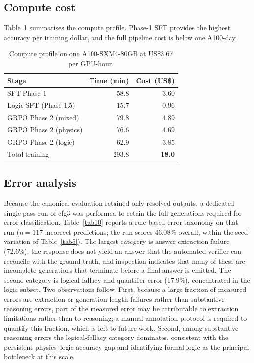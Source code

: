 \documentclass[APA,twocolumn]{USG}
\begin{document}
\subsection{Compute cost}
Table~\ref{tab9} summarises the compute profile. Phase-1 SFT provides the highest
accuracy per training dollar, and the full pipeline cost is below one A100-day.

\begin{table}[t]
\centering
\caption{Compute profile on one A100-SXM4-80GB at US\$3.67 per GPU-hour.\label{tab9}}
\begin{tabular*}{\columnwidth}{@{\extracolsep\fill}lrr@{\extracolsep\fill}}
\toprule
\textbf{Stage} & \textbf{Time (min)} & \textbf{Cost (US\$)} \\
\midrule
SFT Phase 1 & 58.8 & 3.60 \\
Logic SFT (Phase 1.5) & 15.7 & 0.96 \\
GRPO Phase 2 (mixed) & 79.8 & 4.89 \\
GRPO Phase 2 (physics) & 76.6 & 4.69 \\
GRPO Phase 2 (logic) & 62.9 & 3.85 \\
\midrule
Total training & 293.8 & \textbf{18.0} \\
\bottomrule
\end{tabular*}
\end{table}

\subsection{Error analysis}
Because the canonical evaluation retained only resolved outputs, a dedicated
single-pass run of cfg3 was performed to retain the full generations required
for error classification. Table~\ref{tab10} reports a rule-based error taxonomy
on that run ($n=117$ incorrect predictions; the run scores 46.08\% overall,
within the seed variation of Table~\ref{tab5}). The largest category is
answer-extraction failure (72.6\%): the response does not yield an answer that
the automated verifier can reconcile with the ground truth, and inspection
indicates that many of these are incomplete generations that terminate before a
final answer is emitted. The second category is logical-fallacy and
quantifier error (17.9\%), concentrated in the logic subset. Two observations
follow. First, because a large fraction of measured errors are extraction or
generation-length failures rather than substantive reasoning errors, part of the
measured error may be attributable to extraction limitations rather than to
reasoning; a manual annotation protocol is required to quantify this fraction,
which is left to future work. Second, among substantive reasoning errors the
logical-fallacy category dominates, consistent with the persistent
physics--logic accuracy gap and identifying formal logic as the principal
bottleneck at this scale.
\end{document}
